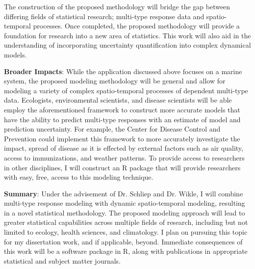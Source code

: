 \documentclass[12pt]{article}
\begin{document}
The construction of the proposed methodology will bridge the gap between differing fields of statistical research; multi-type response data and spatio-temporal processes. Once completed, the proposed methodology will provide a foundation for research into a new area of statistics. This work will also aid in the understanding of incorporating uncertainty quantification into complex dynamical models.



\vspace{2mm}

\noindent \textbf{Broader Impacts}: While the application discussed above focuses on a marine system, the proposed modeling methodology will be general and allow for modeling a variety of complex spatio-temporal processes of dependent multi-type data. Ecologists, environmental scientists, and disease scientists will be able employ the aforementioned framework to construct more accurate models that have the ability to predict multi-type responses with an estimate of model and prediction uncertainty. For example, the Center for Disease Control and Prevention could implement this framework to more accurately investigate the impact, spread of disease as it is effected by external factors such as air quality, access to immunizations, and weather patterns. To provide access to researchers in other disciplines, I will construct an R package that will provide researchers with easy, free, access to this modeling technique.


\vspace{2mm}

\noindent \textbf{Summary}: Under the advisement of Dr. Schliep and Dr. Wikle, I will combine multi-type response modeling with dynamic spatio-temporal modeling, resulting in a novel statistical methodology. The proposed modeling approach will lead to greater statistical capabilities across multiple fields of research, including but not limited to ecology, health sciences, and climatology. I plan on pursuing this topic for my dissertation work, and if applicable, beyond. Immediate consequences of this work will be a software package in R, along with publications in appropriate statistical and subject matter journals.


{\footnotesize }
\end{document}
